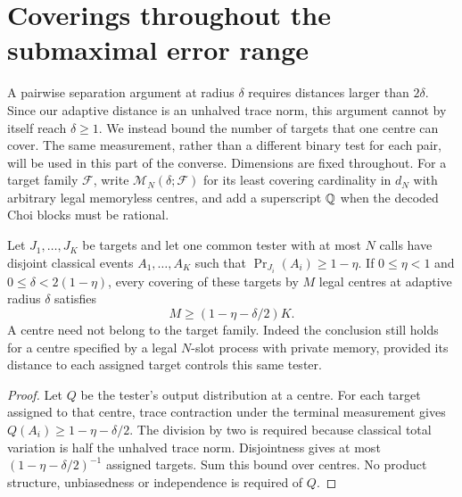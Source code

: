 \section{Coverings throughout the submaximal error range}\label{sec:fullerror71}
A pairwise separation argument at radius $\delta$ requires distances
larger than $2\delta$. Since our adaptive distance is an unhalved trace
norm, this argument cannot by itself reach $\delta\ge1$. We instead
bound the number of targets that one centre can cover. The same
measurement, rather than a different binary test for each pair, will be
used in this part of the converse. Dimensions are fixed throughout. For a target family $\mathcal F$, write
$\mathcal M_N(\delta;\mathcal F)$ for its least covering cardinality
in $d_N$ with arbitrary legal memoryless centres, and add a superscript
$\mathbb Q$ when the decoded Choi blocks must be rational.

\begin{lemma}\label{lem:multiplicity71}
Let $J_1,\ldots,J_K$ be targets and let one common tester with at most
$N$ calls have disjoint classical events $A_1,\ldots,A_K$ such that
$\Pr_{J_i}(A_i)\ge1-\eta$. If $0\le\eta<1$ and
$0\le\delta<2(1-\eta)$, every covering of these targets by $M$ legal
centres at adaptive radius $\delta$ satisfies
\begin{equation}\label{eq:multiplicity71}
                M\ge (1-\eta-\delta/2)K.
\end{equation}
A centre need not belong to the target family. Indeed the conclusion
still holds for a centre specified by a legal $N$-slot process with
private memory, provided its distance to each assigned target controls
this same tester.
\end{lemma}
\begin{proof}
Let $Q$ be the tester's output distribution at a centre. For each target
assigned to that centre, trace contraction under the terminal
measurement gives
$Q(A_i)\ge1-\eta-\delta/2$. The division by two is required because
classical total variation is half the unhalved trace norm. Disjointness
gives at most $(1-\eta-\delta/2)^{-1}$ assigned targets. Sum this
bound over centres. No product structure, unbiasedness or independence
is required of $Q$.
\end{proof}

